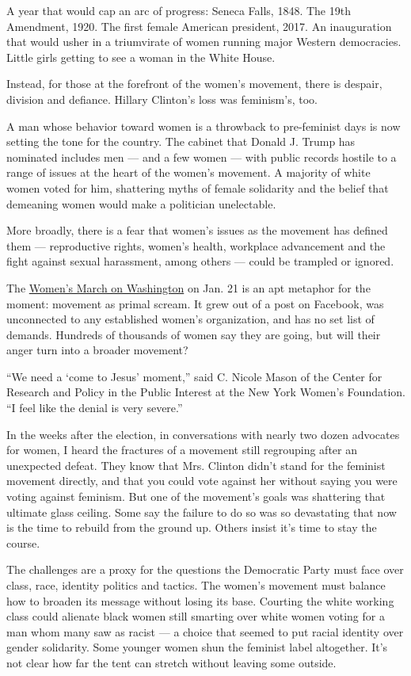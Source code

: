 A year that would cap an arc of progress: Seneca Falls, 1848. The 19th
Amendment, 1920. The first female American president, 2017. An
inauguration that would usher in a triumvirate of women running major
Western democracies. Little girls getting to see a woman in the White
House.

Instead, for those at the forefront of the women's movement, there is
despair, division and defiance. Hillary Clinton's loss was feminism's,
too.

A man whose behavior toward women is a throwback to pre-feminist days is
now setting the tone for the country. The cabinet that Donald J. Trump
has nominated includes men --- and a few women --- with public records
hostile to a range of issues at the heart of the women's movement. A
majority of white women voted for him, shattering myths of female
solidarity and the belief that demeaning women would make a politician
unelectable.

More broadly, there is a fear that women's issues as the movement has
defined them --- reproductive rights, women's health, workplace
advancement and the fight against sexual harassment, among others ---
could be trampled or ignored.

The
\href{https://www.theguardian.com/us-news/2016/dec/27/womens-march-on-washington-dc-guide}{Women's
March on Washington} on Jan. 21 is an apt metaphor for the moment:
movement as primal scream. It grew out of a post on Facebook, was
unconnected to any established women's organization, and has no set list
of demands. Hundreds of thousands of women say they are going, but will
their anger turn into a broader movement?

``We need a `come to Jesus' moment,'' said C. Nicole Mason of the Center
for Research and Policy in the Public Interest at the New York Women's
Foundation. ``I feel like the denial is very severe.''

In the weeks after the election, in conversations with nearly two dozen
advocates for women, I heard the fractures of a movement still
regrouping after an unexpected defeat. They know that Mrs. Clinton
didn't stand for the feminist movement directly, and that you could vote
against her without saying you were voting against feminism. But one of
the movement's goals was shattering that ultimate glass ceiling. Some
say the failure to do so was so devastating that now is the time to
rebuild from the ground up. Others insist it's time to stay the course.

The challenges are a proxy for the questions the Democratic Party must
face over class, race, identity politics and tactics. The women's
movement must balance how to broaden its message without losing its
base. Courting the white working class could alienate black women still
smarting over white women voting for a man whom many saw as racist --- a
choice that seemed to put racial identity over gender solidarity. Some
younger women shun the feminist label altogether. It's not clear how far
the tent can stretch without leaving some outside.

